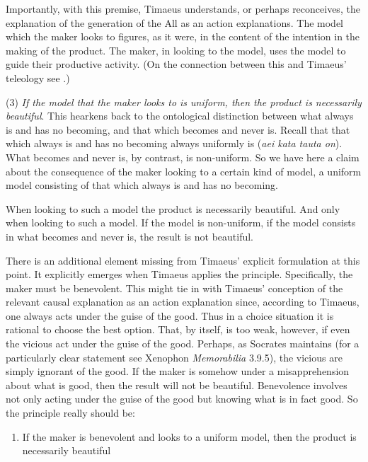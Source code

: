 Importantly, with this premise, Timaeus understands, or perhaps reconceives, the explanation of the generation of the All as an action explanations. The model which the maker looks to figures, as it were, in the content of the intention in the making of the product. The maker, in looking to the model, uses the model to guide their productive activity. (On the connection between this and Timaeus' teleology see \citealt{Johansen:2004dx}.)

(3) \emph{If the model that the maker looks to is uniform, then the product is necessarily beautiful}. This hearkens back to the ontological distinction between what always is and has no becoming, and that which becomes and never is. Recall that that which always is and has no becoming always uniformly is (\emph{aei kata tauta on}). What becomes and never is, by contrast, is non-uniform. So we have here a claim about the consequence of the maker looking to a certain kind of model, a uniform model consisting of that which always is and has no becoming. 

When looking to such a model the product is necessarily beautiful. And only when looking to such a model. If the model is non-uniform, if the model consists in what becomes and never is, the result is not beautiful. 

There is an additional element missing from Timaeus' explicit formulation at this point. It explicitly emerges when Timaeus applies the principle. Specifically, the maker must be benevolent. This might tie in with Timaeus' conception of the relevant causal explanation as an action explanation since, according to Timaeus, one always acts under the guise of the good. Thus in a choice situation it is rational to choose the best option. That, by itself, is too weak, however, if even the vicious act under the guise of the good. Perhaps, as Socrates maintains (for a particularly clear statement see Xenophon \emph{Memorabilia} 3.9.5), the vicious are simply ignorant of the good. If the maker is somehow under a misapprehension about what is good, then the result will not be beautiful. Benevolence involves not only acting under the guise of the good but knowing what is in fact good. So the principle really should be:
\begin{enumerate}[(3*)]
	\item If the maker is benevolent and looks to a uniform model, then the product is necessarily beautiful
\end{enumerate}


